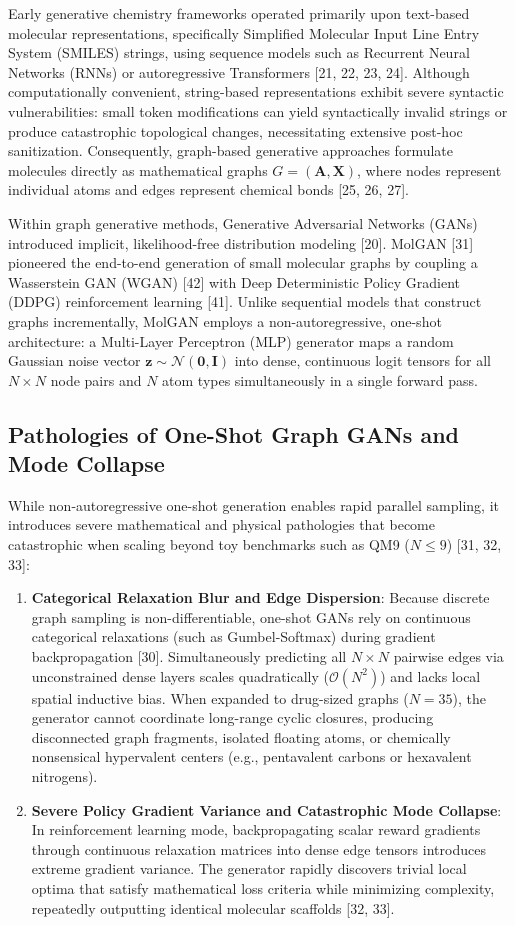 \documentclass[10pt,a4paper]{article}
\begin{document}
Early generative chemistry frameworks operated primarily upon text-based molecular representations, specifically Simplified Molecular Input Line Entry System (SMILES) strings, using sequence models such as Recurrent Neural Networks (RNNs) or autoregressive Transformers [21, 22, 23, 24]. Although computationally convenient, string-based representations exhibit severe syntactic vulnerabilities: small token modifications can yield syntactically invalid strings or produce catastrophic topological changes, necessitating extensive post-hoc sanitization. Consequently, graph-based generative approaches formulate molecules directly as mathematical graphs $G = (\mathbf{A}, \mathbf{X})$, where nodes represent individual atoms and edges represent chemical bonds [25, 26, 27].

Within graph generative methods, Generative Adversarial Networks (GANs) introduced implicit, likelihood-free distribution modeling [20]. MolGAN [31] pioneered the end-to-end generation of small molecular graphs by coupling a Wasserstein GAN (WGAN) [42] with Deep Deterministic Policy Gradient (DDPG) reinforcement learning [41]. Unlike sequential models that construct graphs incrementally, MolGAN employs a non-autoregressive, one-shot architecture: a Multi-Layer Perceptron (MLP) generator maps a random Gaussian noise vector $\mathbf{z} \sim \mathcal{N}(\mathbf{0}, \mathbf{I})$ into dense, continuous logit tensors for all $N \times N$ node pairs and $N$ atom types simultaneously in a single forward pass.

\subsection{Pathologies of One-Shot Graph GANs and Mode Collapse}
While non-autoregressive one-shot generation enables rapid parallel sampling, it introduces severe mathematical and physical pathologies that become catastrophic when scaling beyond toy benchmarks such as QM9 ($N \le 9$) [31, 32, 33]:
\begin{enumerate}[noitemsep]
    \item \textbf{Categorical Relaxation Blur and Edge Dispersion}: Because discrete graph sampling is non-differentiable, one-shot GANs rely on continuous categorical relaxations (such as Gumbel-Softmax) during gradient backpropagation [30]. Simultaneously predicting all $N \times N$ pairwise edges via unconstrained dense layers scales quadratically ($\mathcal{O}(N^2)$) and lacks local spatial inductive bias. When expanded to drug-sized graphs ($N = 35$), the generator cannot coordinate long-range cyclic closures, producing disconnected graph fragments, isolated floating atoms, or chemically nonsensical hypervalent centers (e.g., pentavalent carbons or hexavalent nitrogens).
    \item \textbf{Severe Policy Gradient Variance and Catastrophic Mode Collapse}: In reinforcement learning mode, backpropagating scalar reward gradients through continuous relaxation matrices into dense edge tensors introduces extreme gradient variance. The generator rapidly discovers trivial local optima that satisfy mathematical loss criteria while minimizing complexity, repeatedly outputting identical molecular scaffolds [32, 33].
\end{enumerate}
\end{document}
